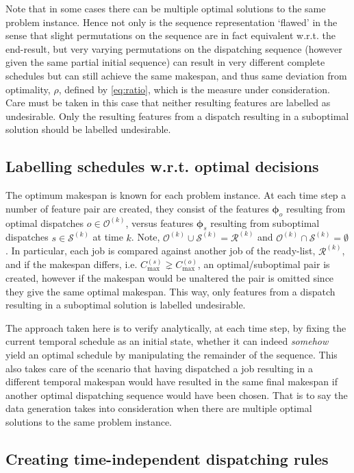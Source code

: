 \documentclass[smallextended]{svjour3}
\renewcommand{\vphi}{\bm \phi}
\begin{document}
Note that in some cases there can be multiple optimal solutions to the same problem instance. Hence not only is the sequence representation `flawed' in the sense that slight permutations on the sequence are in fact equivalent w.r.t. the end-result, but very varying permutations on the dispatching sequence (however given the same partial initial sequence) can result in very different complete schedules but can still achieve the same makespan, and thus same deviation from optimality, $\rho$, defined by \eqref{eq:ratio}, which is the measure under consideration. Care must be taken in this case that neither resulting features are labelled as undesirable. Only the resulting features from a dispatch resulting in a suboptimal solution should be labelled undesirable. 

\subsection{Labelling schedules w.r.t. optimal decisions}
The optimum makespan is known for each problem instance. 
At each time step a number of feature pair are created, they consist of the features $\vphi_o$ resulting from optimal dispatches $o\in\mathcal{O}^{(k)}$, versus features $\vphi_s$ resulting from suboptimal dispatches $s\in\mathcal{S}^{(k)}$ at time $k$. Note, $\mathcal{O}^{(k)}\cup\mathcal{S}^{(k)}=\mathcal{R}^{(k)}$ and $\mathcal{O}^{(k)}\cap\mathcal{S}^{(k)}=\emptyset$.
In particular, each job is compared against another job of the ready-list, $\mathcal{R}^{(k)}$, and if the makespan differs, i.e. $C_{\max}^{(s)}\gneq C_{\max}^{(o)}$, an optimal/suboptimal pair is created, however if the makespan would be unaltered the pair is omitted since they give the same optimal makespan. This way, only features from a dispatch resulting in a suboptimal solution is labelled undesirable.

The approach taken here is to verify analytically, at each time step, by fixing the current temporal schedule as an initial state, whether it can indeed \emph{somehow} yield an optimal schedule by manipulating the remainder of the sequence. This also takes care of the scenario that having dispatched a job resulting in a different temporal makespan would have resulted in the same final makespan if another optimal dispatching sequence would have been chosen. That is to say the data generation takes into consideration when there are multiple optimal solutions to the same problem instance. 



\subsection{Creating time-independent dispatching rules}\label{sec:ord:timeindependent}
\end{document}
